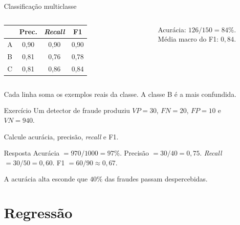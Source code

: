 \documentclass[10pt]{beamer}
\begin{document}
\begin{frame}{Classificação multiclasse}
\begin{columns}[c]
\centering
{}
\footnotesize
\begin{tabular}{@{}lccc@{}}
\toprule
 & Prec. & \textit{Recall} & F1 \\
\midrule
A & 0,90 & 0,90 & 0,90 \\
B & 0,81 & 0,76 & 0,78 \\
C & 0,81 & 0,86 & 0,84 \\
\bottomrule
\end{tabular}

\vspace{2mm}
Acurácia: $126/150=84\%$. Média macro do F1: $0{,}84$.
\end{columns}
\vspace{1mm}
\small Cada linha soma os exemplos reais da classe. A classe B é a mais confundida.
\end{frame}

\begin{frame}{Exercício}
Um detector de fraude produziu $VP=30$, $FN=20$, $FP=10$ e $VN=940$.

Calcule acurácia, precisão, \textit{recall} e F1.

\pause
\vspace{2mm}
\begin{block}{Resposta}
Acurácia $=970/1000=97\%$. Precisão $=30/40=0{,}75$. \textit{Recall} $=30/50=0{,}60$. F1 $=60/90\approx0{,}67$.
\end{block}
\small A acurácia alta esconde que $40\%$ das fraudes passam despercebidas.
\end{frame}

\section{Regressão}
\end{document}
